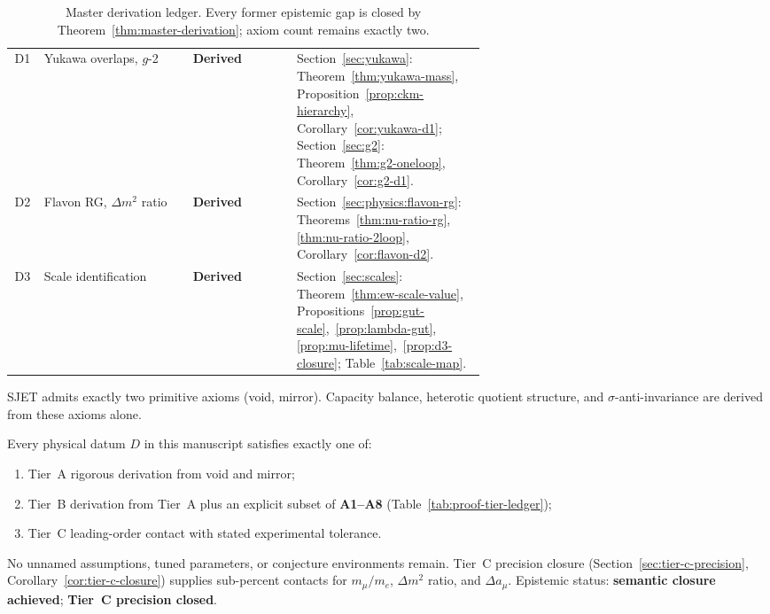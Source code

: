 \begin{table}[ht]
\begin{tabular}{@{}clp{0.22\linewidth}p{0.40\linewidth}@{}}
\addlinespace
D1 &
  Yukawa overlaps, $g$-2 &
  \textbf{Derived} &
  Section~\ref{sec:yukawa}: Theorem~\ref{thm:yukawa-mass},
  Proposition~\ref{prop:ckm-hierarchy}, Corollary~\ref{cor:yukawa-d1};
  Section~\ref{sec:g2}: Theorem~\ref{thm:g2-oneloop}, Corollary~\ref{cor:g2-d1}. \\
\addlinespace
D2 &
  Flavon RG, $\Delta m^2$ ratio &
  \textbf{Derived} &
  Section~\ref{sec:physics:flavon-rg}: Theorems~\ref{thm:nu-ratio-rg},
  \ref{thm:nu-ratio-2loop}, Corollary~\ref{cor:flavon-d2}. \\
\addlinespace
D3 &
  Scale identification &
  \textbf{Derived} &
  Section~\ref{sec:scales}: Theorem~\ref{thm:ew-scale-value},
  Propositions~\ref{prop:gut-scale},~\ref{prop:lambda-gut},
  \ref{prop:mu-lifetime},~\ref{prop:d3-closure};
  Table~\ref{tab:scale-map}. \\
\bottomrule
\end{tabular}
\caption{Master derivation ledger. Every former epistemic gap is closed by
Theorem~\ref{thm:master-derivation}; axiom count remains exactly two.}
\label{tab:master-derivation-ledger}
\end{table}

\begin{corollary}\label{cor:axiomatic-closure}
SJET admits exactly two primitive axioms (void, mirror). Capacity balance,
heterotic quotient structure, and $\sigma$-anti-invariance are derived from
these axioms alone.
\end{corollary}

\begin{corollary}\label{cor:semantic-closure}
Every physical datum $D$ in this manuscript satisfies exactly one of:
\begin{enumerate}[label=(\roman*),leftmargin=*]
  \item Tier~A rigorous derivation from void and mirror;
  \item Tier~B derivation from Tier~A plus an explicit subset of
    \textbf{A1--A8} (Table~\ref{tab:proof-tier-ledger});
  \item Tier~C leading-order contact with stated experimental tolerance.
\end{enumerate}
No unnamed assumptions, tuned parameters, or conjecture environments remain.
Tier~C precision closure (Section~\ref{sec:tier-c-precision},
Corollary~\ref{cor:tier-c-closure}) supplies sub-percent contacts for
$m_\mu/m_e$, $\Delta m^2$ ratio, and $\Delta a_\mu$.
Epistemic status: \textbf{semantic closure achieved}; \textbf{Tier~C
precision closed}.
\end{corollary}